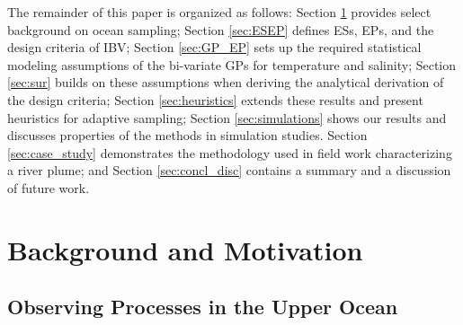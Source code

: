 \documentclass[aoas]{imsart}
\begin{document}
The remainder of this paper is organized as follows: Section
\ref{sec:bg} provides select background on ocean sampling; Section
\ref{sec:ESEP} defines ESs, EPs, and the design criteria of IBV;
Section \ref{sec:GP_EP} sets up the required statistical modeling
assumptions of the bi-variate GPs for temperature and salinity;
Section \ref{sec:sur} builds on these assumptions when deriving the
analytical derivation of the design criteria; Section
\ref{sec:heuristics} extends these results and present heuristics for
adaptive sampling; Section \ref{sec:simulations} shows our results and
discusses properties of the methods in simulation studies. Section
\ref{sec:case_study} demonstrates the methodology used in field work
characterizing a river plume; and Section \ref{sec:concl_disc}
contains a summary and a discussion of future work.


\section{Background and Motivation}\label{sec:bg}


\subsection{Observing Processes in the Upper Ocean}


\end{document}
